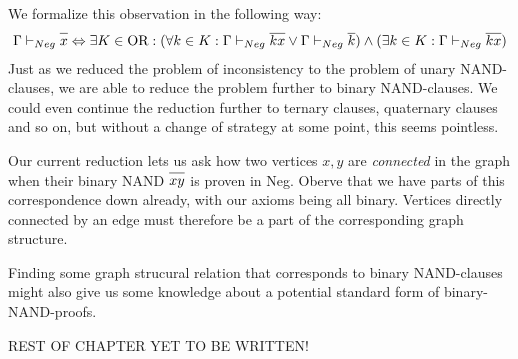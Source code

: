 We formalize this observation in the following way:
\begin{align}
  \Gamma \vdash_{Neg} \ol{x} \Leftrightarrow \exists K \in \text{OR}: (\forall k \in K: \Gamma \vdash_{Neg} \ol{kx} \vee \Gamma \vdash_{Neg} \ol{k}) \wedge (\exists k \in K: \Gamma \vdash_{Neg} \ol{kx})
\end{align}
Just as we reduced the problem of inconsistency to the problem of unary NAND-clauses, we are able to reduce the problem further to binary NAND-clauses.
We could even continue the reduction further to ternary clauses, quaternary clauses and so on, but without a change of strategy at some point, this seems pointless.

Our current reduction lets us ask how two vertices $x,y$ are \textit{connected} in the graph when their binary NAND $\ol{xy}$ is proven in Neg.
Oberve that we have parts of this correspondence down already, with our axioms being all binary.
Vertices directly connected by an edge must therefore be a part of the corresponding graph structure.

Finding some graph strucural relation that corresponds to binary NAND-clauses might also give us some knowledge about a potential standard form of binary-NAND-proofs.

REST OF CHAPTER YET TO BE WRITTEN!
